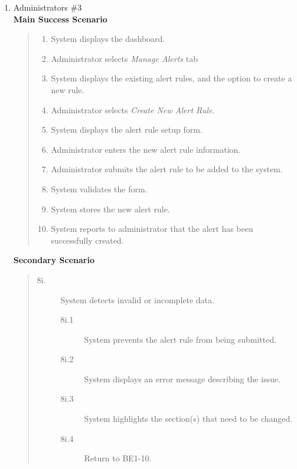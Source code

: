 \documentclass[]{article}
\begin{document}
\begin{enumerate}[{\bf BE1.}]
\begin{enumerate}[{\bf VP1.}]
			\item Administrators \#3 \\
				\textbf{Main Success Scenario} 
                    \begin{quote}
                    \begin{enumerate}[1.]
                        \item System displays the dashboard.
                        \item Administrator selects \textit{Manage Alerts} tab
                        \item System displays the existing alert rules, and the option to create a new rule.
                        \item Administrator selects \textit{Create New Alert Rule}.
                        \item System displays the alert rule setup form.
                        \item Administrator enters the new alert rule information.
                        \item Administrator submits the alert rule to be added to the system.
                        \item System validates the form.
                        \item System stores the new alert rule.
                        \item System reports to administrator that the alert has been successfully created.
                    \end{enumerate}
                    \end{quote}
                \textbf{Secondary Scenario} 
                \begin{quote}
                    \begin{description}
                        \item[\textmd{8i.}] System detects invalid or incomplete data.
                        \begin{description}
                            \item[\textmd{8i.1}] System prevents the alert rule from being submitted.
                            \item[\textmd{8i.2}] System displays an error message describing the issue.
                            \item[\textmd{8i.3}] System highlights the section(s) that need to be changed.
                            \item[\textmd{8i.4}] Return to BE1-10.

\end{description}
\end{description}
\end{quote}
\end{enumerate}
\end{enumerate}
\end{document}
